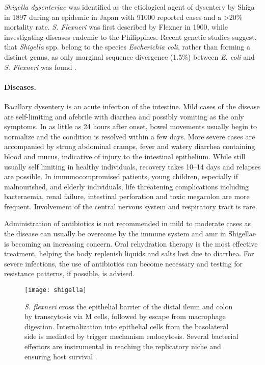 \textit{Shigella dysenteriae} was identified as the etiological agent of dysentery by Shiga in 1897 during an epidemic in Japan with 91000 reported cases and a \textgreater 20\% mortality rate. \textit{S. Flexneri} was first described by Flexner in 1900, while investigating diseases endemic to the Philippines. Recent genetic studies suggest, that \textit{Shigella} spp. belong to the species \textit{Escherichia coli}, rather than forming a distinct genus, as only marginal sequence divergence (1.5\%) between \textit{E. coli} and \textit{S. Flexneri} was found \citep{Schroeder2008,Croxen2010}.

\paragraph{Diseases.}
Bacillary dysentery is an acute infection of the intestine. Mild cases of the disease are self-limiting and afebrile with diarrhea and possibly vomiting as the only symptoms. In as little as 24 hours after onset, bowel movements usually begin to normalize and the condition is resolved within a few days. More severe cases are accompanied by strong abdominal cramps, fever and watery diarrhea containing blood and mucus, indicative of injury to the intestinal epithelium. While still usually self limiting in healthy individuals, recovery takes 10--14 days and relapses are possible. In immunocompromised patients, young children, especially if malnourished, and elderly individuals, life threatening complications including bacteraemia, renal failure, intestinal perforation and toxic megacolon are more frequent. Involvement of the central nervous system and respiratory tract is rare.

Administration of antibiotics is not recommended in mild to moderate cases as the disease can usually be overcome by the immune system and \gls{amr} in Shigellae is becoming an increasing concern. Oral rehydration therapy is the most effective treatment, helping the body replenish liquids and salts lost due to diarrhea. For severe infections, the use of antibiotics can become necessary and testing for resistance patterns, if possible, is advised.

\begin{figure}
  \centering
  \texttt{[image: shigella]}
  \caption[Route of infection and intracellular life-cycle of \textit{S. flexneri}.]{\textit{S. flexneri} cross the epithelial barrier of the distal ileum and colon by transcytosis via M cells, followed by escape from macrophage digestion. Internalization into epithelial cells from the basolateral side is mediated by trigger mechanism endocytosis. Several bacterial effectors are instrumental in reaching the replicatory niche and ensuring host survival \cite{Croxen2010}.}
  \label{fig:shigella}
\end{figure}

